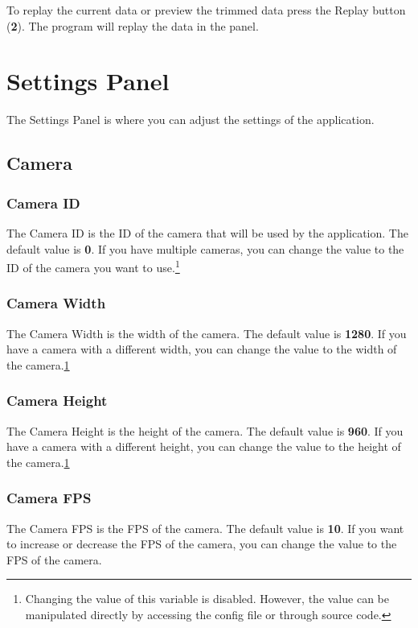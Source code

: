 To replay the current data or preview the trimmed data press the Replay button (\textbf{2}). The program will replay the data in the panel.

\pagebreak
\section{Settings Panel}
\label{sec:settings-panel}

The Settings Panel is where you can adjust the settings of the application.

\subsection{Camera}

\subsubsection{Camera ID}
The Camera ID is the ID of the camera that will be used by the application. The default value is \textbf{0}. If you have multiple cameras, you can change the value to the ID of the camera you want to use.\footnote{\label{label1}Changing the value of this variable is disabled. However, the value can be manipulated directly by accessing the config file or through source code.}

\subsubsection{Camera Width}
The Camera Width is the width of the camera. The default value is \textbf{1280}. If you have a camera with a different width, you can change the value to the width of the camera.\cref{label1}

\subsubsection{Camera Height}
The Camera Height is the height of the camera. The default value is \textbf{960}. If you have a camera with a different height, you can change the value to the height of the camera.\cref{label1}

\subsubsection{Camera FPS}
The Camera FPS is the FPS of the camera. The default value is \textbf{10}. If you want to increase or decrease the FPS of the camera, you can change the value to the FPS of the camera.

